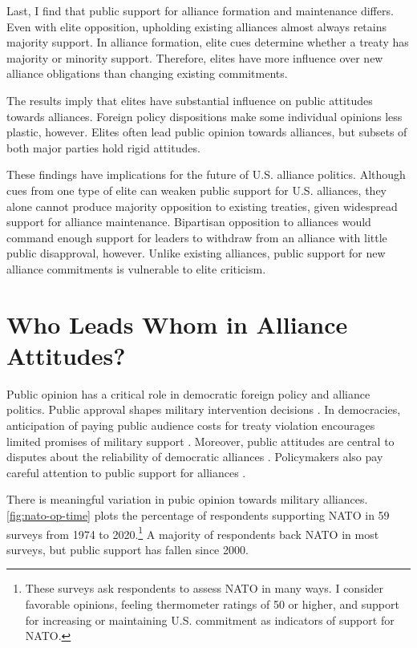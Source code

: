 \documentclass[12pt]{article}
\begin{document}
Last, I find that public support for alliance formation and maintenance differs.
Even with elite opposition, upholding existing alliances almost always retains majority support. 
In alliance formation, elite cues determine whether a treaty has majority or minority support. 
Therefore, elites have more influence over new alliance obligations than changing existing commitments. 


The results imply that elites have substantial influence on public attitudes towards alliances. 
Foreign policy dispositions make some individual opinions less plastic, however. 
Elites often lead public opinion towards alliances, but subsets of both major parties hold rigid attitudes.


These findings have implications for the future of U.S. alliance politics. 
Although cues from one type of elite can weaken public support for U.S. alliances, they alone cannot produce majority opposition to existing treaties, given widespread support for alliance maintenance.
Bipartisan opposition to alliances would command enough support for leaders to withdraw from an alliance with little public disapproval, however.  
Unlike existing alliances, public support for new alliance commitments is vulnerable to elite criticism. 



\section{Who Leads Whom in Alliance Attitudes?}


Public opinion has a critical role in democratic foreign policy and alliance politics.
Public approval shapes military intervention decisions \citep{Tomzetal2020, LinGreenberg2021}. 
In democracies, anticipation of paying public audience costs for treaty violation encourages limited promises of military support \citep{Chibaetal2015, FjelstulReiter2019}. 
Moreover, public attitudes are central to disputes about the reliability of democratic alliances \citep{Gaubatz1996, GartzkeGleditsch2004}. 
Policymakers also pay careful attention to public support for alliances \citep{Sayle2019}. 


There is meaningful variation in pubic opinion towards military alliances. 
\autoref{fig:nato-op-time} plots the percentage of respondents supporting NATO in 59 surveys from 1974 to 2020.\footnote{These surveys ask respondents to assess NATO in many ways. I consider favorable opinions, feeling thermometer ratings of 50 or higher, and support for increasing or maintaining U.S. commitment as indicators of support for NATO.} 
A majority of respondents back NATO in most surveys, but public support has fallen since 2000.  
\end{document}
